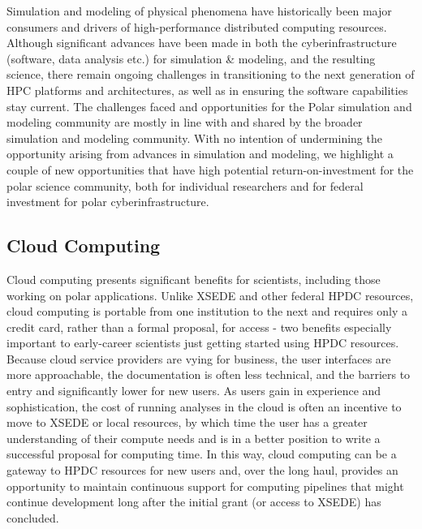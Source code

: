 \documentclass[10pt,letterpaper,draft]{article}
\begin{document}
Simulation and modeling of physical phenomena have historically been major consumers and drivers of high-performance distributed computing resources. Although significant advances have been made in both the cyberinfrastructure (software, data analysis etc.) for simulation \& modeling, and the resulting science, there remain ongoing challenges in transitioning to the next generation of HPC platforms and architectures, as well as in ensuring the software capabilities stay current. The challenges faced and opportunities for the Polar simulation and modeling community are mostly in line with and shared by the broader simulation and modeling community. With no intention of undermining the opportunity arising from advances in simulation and modeling, we highlight a couple of new opportunities that have high potential return-on-investment for the polar science community, both for individual researchers and for federal investment for polar cyberinfrastructure.

\subsection*{Cloud Computing}
Cloud computing presents significant benefits for scientists, including those working on polar applications. Unlike XSEDE and other federal HPDC resources, cloud computing is portable from one institution to the next and requires only a credit card, rather than a formal proposal, for access - two benefits especially important to early-career scientists just getting started using HPDC resources. Because cloud service providers are vying for business, the user interfaces are more approachable, the documentation is often less technical, and the barriers to entry and significantly lower for new users. As users gain in experience and sophistication, the cost of running analyses in the cloud is often an incentive to move to XSEDE or local resources, by which time the user has a greater understanding of their compute needs and is in a better position to write a successful proposal for computing time. In this way, cloud computing can be a gateway to HPDC resources for new users and, over the long haul, provides an opportunity to maintain continuous support for computing pipelines that might continue development long after the initial grant (or access to XSEDE) has concluded. 
\end{document}

